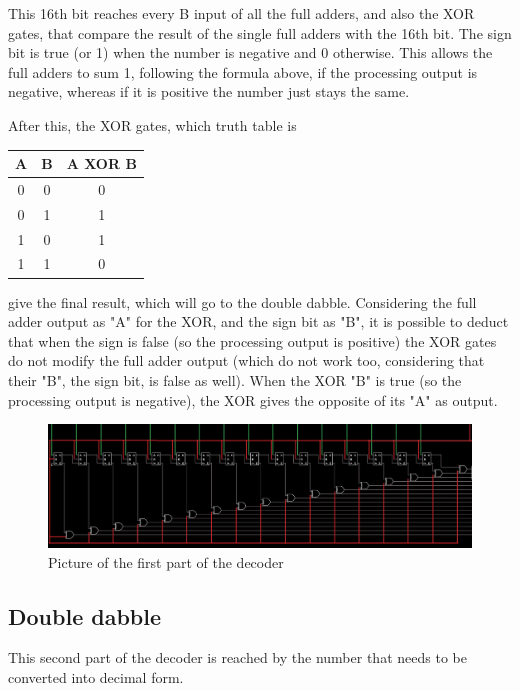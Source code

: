 \documentclass{article}
\begin{document}
This 16th bit reaches every B input of all the full adders, and also the XOR gates, that compare the result of the single full adders with the 16th bit. The sign bit is true (or 1) when the number is negative and 0 otherwise. This allows the full adders to sum 1, following the formula above, if the processing output is negative, whereas if it is positive the number just stays the same.

After this, the XOR gates, which truth table is 
\begin{center}
\begin{tabular}{||c|c||c||}
    \hline
    A & B & A XOR B \\
    \hline
    0 & 0 & 0 \\
    \hline
    0 & 1 & 1 \\
    \hline
    1 & 0 & 1 \\
    \hline
    1 & 1 & 0 \\
    \hline
\end{tabular}
\end{center}

give the final result, which will go to the double dabble. Considering the full adder output as "A" for the XOR, and the sign bit as "B", it is possible to deduct that when the sign is false (so the processing output is positive) the XOR gates do not modify the full adder output (which do not work too, considering that their "B", the sign bit, is false as well). When the XOR "B" is true (so the processing output is negative), the XOR gives the opposite of its "A" as output.

\begin{figure}[h]
    \centering
    \includegraphics[scale=0.43]{SC_Converter.JPG}
    \caption{Picture of the first part of the decoder}
    \label{Converter}
  \end{figure}

\subsection{Double dabble}

This second part of the decoder is reached by the number that needs to be converted into decimal form. 
\end{document}
